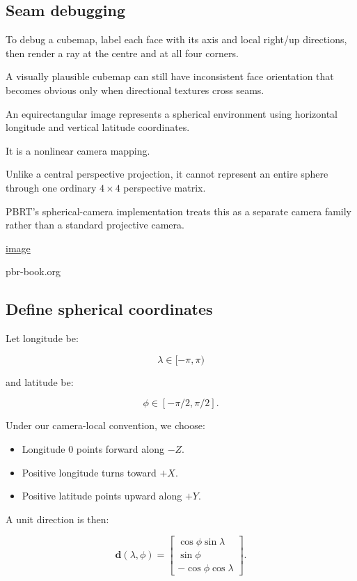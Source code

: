\subsection{Seam debugging}\label{02-foundations-ii-ch035-seam-debugging}

To debug a cubemap, label each face with its axis and local right/up directions, then render a ray at the centre and at all four corners.

A visually plausible cubemap can still have inconsistent face orientation that becomes obvious only when directional textures cross seams.

An equirectangular image represents a spherical environment using horizontal longitude and vertical latitude coordinates.

It is a nonlinear camera mapping.

Unlike a central perspective projection, it cannot represent an entire sphere through one ordinary \(4\times4\) perspective matrix.

PBRT's spherical-camera implementation treats this as a separate camera family rather than a standard projective camera. 

\href{https://www.google.com/s2/favicons?domain=https://pbr-book.org&sz=32}{image}

pbr-book.org

\subsection{Define spherical coordinates}\label{02-foundations-ii-ch035-define-spherical-coordinates}

Let longitude be:

\[ \lambda\in[-\pi,\pi) \]

and latitude be:

\[ \phi\in[-\pi/2,\pi/2]. \]

Under our camera-local convention, we choose:

\begin{itemize}
\tightlist
\item
  Longitude \(0\) points forward along \(-Z\).
\item
  Positive longitude turns toward \(+X\).
\item
  Positive latitude points upward along \(+Y\).
\end{itemize}

A unit direction is then:

\[ \boxed{ \mathbf d(\lambda,\phi)= \begin{bmatrix} \cos\phi\sin\lambda\\ \sin\phi\\ -\cos\phi\cos\lambda \end{bmatrix}. } \]

